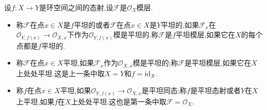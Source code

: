设$f:X\to Y$是环空间之间的态射,设$\mathscr{F}$是$\mathscr{O}_X$模层.
\begin{itemize}
	\item 称$\mathscr{F}$在点$x\in X$是$f$平坦的或者$\mathscr{F}$在点$x\in X$是$Y$平坦的,如果$\mathscr{F}_x$在$\mathscr{O}_{Y,f(x)}\to\mathscr{O}_{X,x}$下作为$\mathscr{O}_{Y,f(x)}$模是平坦的.称$\mathscr{F}$是$f$平坦模层,如果它在$X$的每个点都是$f$平坦的.
	\item 称$\mathscr{F}$在点$x\in X$平坦,如果$\mathscr{F}_x$作为$\mathscr{O}_{X,x}$模是平坦的;称$\mathscr{F}$是平坦模层,如果它在$X$上处处平坦.这是上一条中取$X=Y$和$f=\mathrm{id}_X$.
	\item 称$f$在点$x\in X$平坦,如果$\mathscr{O}_{Y,f(x)}\to\mathscr{O}_{X,x}$是平坦同态;称$f$是平坦态射或者$Y$在$X$上平坦,如果$f$在$X$上处处平坦.这也是第一条中取$\mathscr{F}=\mathscr{O}_X$.
\end{itemize}

